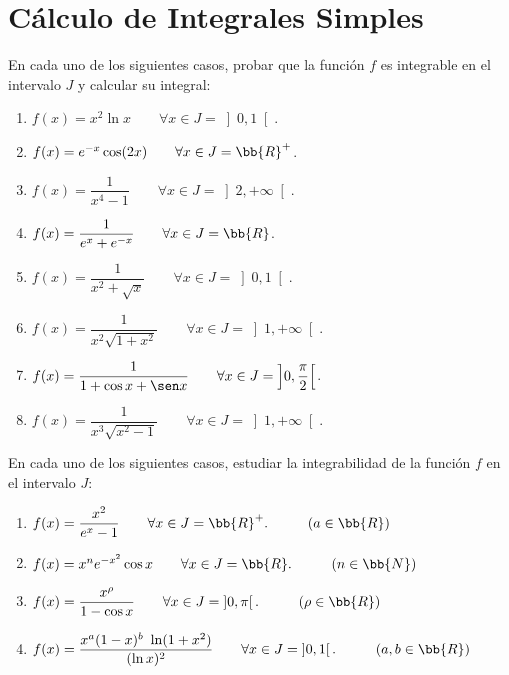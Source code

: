 \section{Cálculo de Integrales Simples}

\begin{ejercicio}
    En cada uno de los siguientes casos, probar que la función $f$ es integrable en el
    intervalo $J$ y calcular su integral:
    \begin{enumerate}
        \item $f(x)=x^2\ln x \qquad \forall x\in J=\left]0,1\right[$.
        \item $f(x)=e^{-x}\cos(2x) \qquad \forall x\in J=\bb{R}^+$.
        \item $f(x)=\dfrac{1}{x^4-1} \qquad \forall x\in J=\left]2,+\infty\right[$.
        \item $f(x)=\dfrac{1}{e^x+e^{-x}} \qquad \forall x\in J=\bb{R}$.
        \item $f(x)=\dfrac{1}{x^2 + \sqrt{x}} \qquad \forall x\in J=\left]0,1\right[$.
        \item $f(x)=\dfrac{1}{x^2\sqrt{1+x^2}} \qquad \forall x\in J=\left]1,+\infty\right[$.  
        \item $f(x)=\dfrac{1}{1+\cos x + \sen x} \qquad \forall x\in J=\left]0,\dfrac{\pi}{2}\right[$.
        \item $f(x)=\dfrac{1}{x^3\sqrt{x^2-1}} \qquad \forall x\in J=\left]1,+\infty\right[$.
    \end{enumerate}
\end{ejercicio}



\begin{ejercicio}
    En cada uno de los siguientes casos, estudiar la integrabilidad de la función $f$ en
    el intervalo $J$:
    \begin{enumerate}
        \item $f(x)=\dfrac{x^2}{e^x-1}\qquad \forall x\in J=\bb{R}^+.\hspace{1cm}(a\in \bb{R})$
        \item $f(x)=x^ne^{-x^2}\cos x \qquad \forall x\in J=\bb{R}.\hspace{1cm}(n\in \bb{N})$
        \item $f(x)=\dfrac{x^\rho}{1-\cos x} \qquad \forall x\in J=\left]0,\pi\right[.\hspace{1cm}(\rho\in \bb{R})$
        \item $f(x)=\dfrac{x^a(1-x)^b~\ln(1+x^2)}{(\ln x)^2} \qquad \forall x\in J=\left]0,1\right[.\hspace{1cm}(a,b\in \bb{R})$
    \end{enumerate}
\end{ejercicio}
